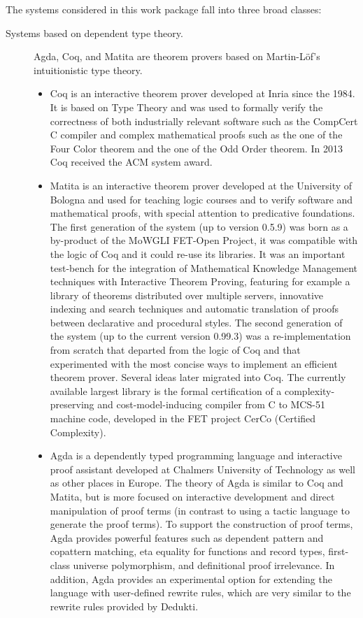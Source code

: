 The systems considered in this work package fall into three broad
classes:
\begin{description}

  \item[Systems based on dependent type theory.] Agda, Coq, and Matita
  are theorem provers based on Martin-L\"of's intuitionistic type
  theory.

  \begin{itemize}
    \item Coq is an interactive theorem prover developed at Inria
    since the 1984.  It is based on Type Theory and was used to
    formally verify the correctness of both industrially relevant
    software such as the CompCert C compiler and complex mathematical
    proofs such as the one of the Four Color theorem and the one of
    the Odd Order theorem. In 2013 Coq received the ACM system award.

    \item Matita is an interactive theorem prover developed at the
    University of Bologna and used for teaching logic courses and to
    verify software and mathematical proofs, with special attention to
    predicative foundations. The first generation of the system (up to
    version 0.5.9) was born as a by-product of the MoWGLI FET-Open
    Project, it was compatible with the logic of Coq and it could
    re-use its libraries. It was an important test-bench for the
    integration of Mathematical Knowledge Management techniques with
    Interactive Theorem Proving, featuring for example a library of
    theorems distributed over multiple servers, innovative indexing
    and search techniques and automatic translation of proofs between
    declarative and procedural styles. The second generation of the
    system (up to the current version 0.99.3) was a re-implementation
    from scratch that departed from the logic of Coq and that
    experimented with the most concise ways to implement an efficient
    theorem prover. Several ideas later migrated into Coq. The
    currently available largest library is the formal certification of
    a complexity-preserving and cost-model-inducing compiler from C to
    MCS-51 machine code, developed in the FET project CerCo (Certified
    Complexity).

    \item Agda is a dependently typed programming language and
    interactive proof assistant developed at Chalmers University of
    Technology as well as other places in Europe. The theory of Agda
    is similar to Coq and Matita, but is more focused on interactive
    development and direct manipulation of proof terms (in contrast to
    using a tactic language to generate the proof terms). To support
    the construction of proof terms, Agda provides powerful features
    such as dependent pattern and copattern matching, eta equality for
    functions and record types, first-class universe polymorphism, and
    definitional proof irrelevance. In addition, Agda provides an
    experimental option for extending the language with user-defined
    rewrite rules, which are very similar to the rewrite rules
    provided by Dedukti.
  \end{itemize}


\end{description}
